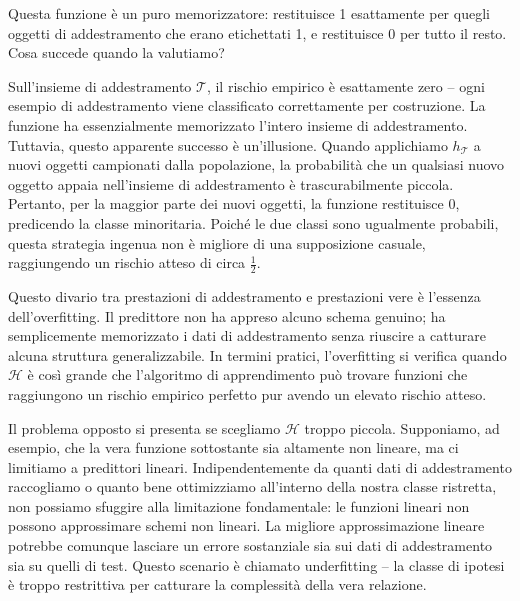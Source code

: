 Questa funzione è un puro \alert{memorizzatore}: restituisce 1 esattamente per quegli oggetti di addestramento che erano etichettati 1, e restituisce 0 per tutto il resto. Cosa succede quando la valutiamo?

Sull'insieme di addestramento $\mathcal{T}$, il rischio empirico è esattamente zero -- ogni esempio di addestramento viene classificato correttamente per costruzione. La funzione ha essenzialmente memorizzato l'intero insieme di addestramento. Tuttavia, questo apparente successo è un'illusione. Quando applichiamo $h_{\mathcal{T}}$ a nuovi oggetti campionati dalla popolazione, la probabilità che un qualsiasi nuovo oggetto appaia nell'insieme di addestramento è trascurabilmente piccola. Pertanto, per la maggior parte dei nuovi oggetti, la funzione restituisce 0, predicendo la classe minoritaria. Poiché le due classi sono ugualmente probabili, questa strategia ingenua non è migliore di una supposizione casuale, raggiungendo un rischio atteso di circa $\frac{1}{2}$.

Questo divario tra prestazioni di addestramento e prestazioni vere è l'essenza dell'\alert{overfitting}. Il predittore non ha appreso alcuno schema genuino; ha semplicemente memorizzato i dati di addestramento senza riuscire a catturare alcuna struttura generalizzabile. In termini pratici, l'overfitting si verifica quando $\mathcal{H}$ è così grande che l'algoritmo di apprendimento può trovare funzioni che raggiungono un rischio empirico perfetto pur avendo un elevato rischio atteso.

\medskip
Il problema opposto si presenta se scegliamo $\mathcal{H}$ troppo piccola. Supponiamo, ad esempio, che la vera funzione sottostante sia altamente non lineare, ma ci limitiamo a predittori lineari. Indipendentemente da quanti dati di addestramento raccogliamo o quanto bene ottimizziamo all'interno della nostra classe ristretta, non possiamo sfuggire alla limitazione fondamentale: le funzioni lineari non possono approssimare schemi non lineari. La migliore approssimazione lineare potrebbe comunque lasciare un errore sostanziale sia sui dati di addestramento sia su quelli di test. Questo scenario è chiamato \alert{underfitting} -- la classe di ipotesi è troppo restrittiva per catturare la complessità della vera relazione.

